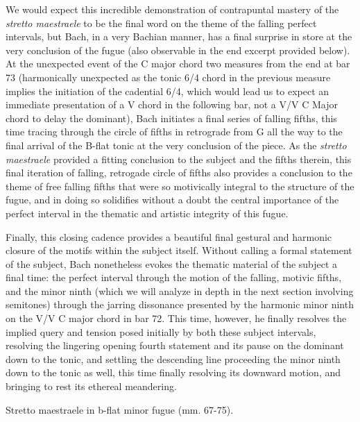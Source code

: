 We would expect this incredible demonstration of contrapuntal mastery of
the \emph{stretto maestraele} to be the final word on the theme of the
falling perfect intervals, but Bach, in a very Bachian manner, has a
final surprise in store at the very conclusion of the fugue (also
observable in the end excerpt provided below). At the unexpected event
of the C major chord two measures from the end at bar 73 (harmonically
unexpected as the tonic 6/4 chord in the previous measure implies the
initiation of the cadential 6/4, which would lead us to expect an
immediate presentation of a V chord in the following bar, not a V/V C
Major chord to delay the dominant), Bach initiates a final series of
falling fifths, this time tracing through the circle of fifths in
retrograde from G all the way to the final arrival of the B-flat tonic
at the very conclusion of the piece. As the \emph{stretto maestraele}
provided a fitting conclusion to the subject and the fifths therein,
this final iteration of falling, retrogade circle of fifths also
provides a conclusion to the theme of free falling fifths that were so
motivically integral to the structure of the fugue, and in doing so
solidifies without a doubt the central importance of the perfect
interval in the thematic and artistic integrity of this fugue.

Finally, this closing cadence provides a beautiful final gestural and
harmonic closure of the motifs within the subject itself. Without
calling a formal statement of the subject, Bach nonetheless evokes the
thematic material of the subject a final time: the perfect interval
through the motion of the falling, motivic fifths, and the minor ninth
(which we will analyze in depth in the next section involving semitones)
through the jarring dissonance presented by the harmonic minor ninth on
the V/V C major chord in bar 72. This time, however, he finally resolves
the implied query and tension posed initially by both these subject
intervals, resolving the lingering opening fourth statement and its
pause on the dominant down to the tonic, and settling the descending
line proceeding the minor ninth down to the tonic as well, this time
finally resolving its downward motion, and bringing to rest its ethereal
meandering.



\begin{Example}[H]
    \begin{center}
    \caption{ Stretto maestraele in b-flat minor fugue (mm. 67-75). }
    \end{center}
\end{Example}
    
